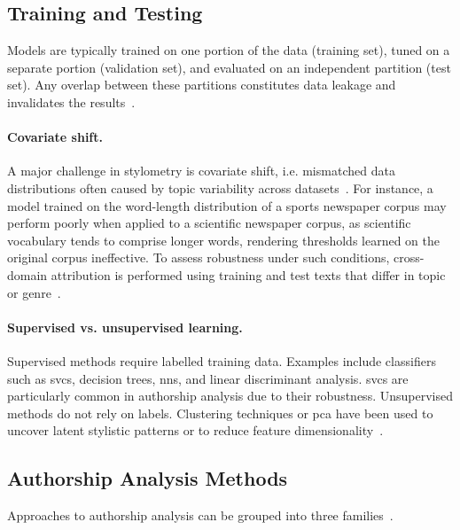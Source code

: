 \subsection{Training and Testing}

Models are typically trained on one portion of the data (training set), tuned on a separate portion (validation set), and evaluated on an independent partition (test set). 
Any overlap between these partitions constitutes data leakage and invalidates the results~\citep{bischoff_importance_2020,altakrori_topic_2021,boenninghoff_o2d2_2021}. 

\paragraph{Covariate shift.} %
A major challenge in stylometry is covariate shift, i.e. mismatched data distributions often caused by topic variability across datasets~\citep{boenninghoff_o2d2_2021}. 
For instance, a model trained on the word-length distribution of a sports newspaper corpus may perform poorly when applied to a scientific newspaper corpus, as scientific vocabulary tends to comprise longer words, rendering thresholds learned on the original corpus ineffective. 
To assess robustness under such conditions, cross-domain attribution is performed using training and test texts that differ in topic or genre~\citep{barlas_cross_domain_2020}.

\paragraph{Supervised vs. unsupervised learning.}  
Supervised methods require labelled training data. 
Examples include classifiers such as \acp{svc}, decision trees, \acp{nn}, and linear discriminant analysis. 
\acp{svc} are particularly common in authorship analysis due to their robustness. 
Unsupervised methods do not rely on labels.
Clustering techniques or \acl{pca} have been used to uncover latent stylistic patterns or to reduce feature dimensionality~\citep{abbasi_writeprints_2008}.


\subsection{Authorship Analysis Methods}
\label{subsec:attribution_methods}

Approaches to authorship analysis can be grouped into three families~\citep{stamatatos_survey_2009}.

